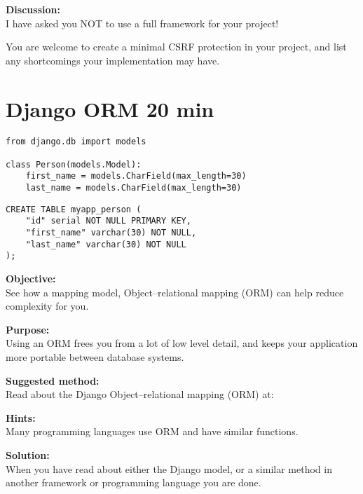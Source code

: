 \documentclass[a4paper,11pt,notitlepage]{report}
\begin{document}
{\bf Discussion:}\\
I have asked you NOT to use a full framework for your project!

You are welcome to create a minimal CSRF protection in your project, and list any shortcomings your implementation may have.


\chapter{Django ORM 20 min}
\label{ex:django-orm}

\begin{verbatim}
from django.db import models

class Person(models.Model):
    first_name = models.CharField(max_length=30)
    last_name = models.CharField(max_length=30)
\end{verbatim}

\begin{verbatim}
CREATE TABLE myapp_person (
    "id" serial NOT NULL PRIMARY KEY,
    "first_name" varchar(30) NOT NULL,
    "last_name" varchar(30) NOT NULL
);
\end{verbatim}

{\bf Objective:}\\
See how a mapping model, Object–relational mapping (ORM) can help reduce complexity for you.


{\bf Purpose:}\\
Using an ORM frees you from a lot of low level detail, and keeps your application more portable between database systems.


{\bf Suggested method:}\\
Read about the Django  Object–relational mapping (ORM) at:

\begin{list2}
\item {}
\item {}
\end{list2}

{\bf Hints:}\\
Many programming languages use ORM and have similar functions.

{\bf Solution:}\\
When you have read about either the Django model, or a similar method in another framework or programming language you are done.
\end{document}
